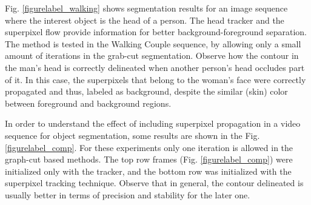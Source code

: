Fig. \ref{figurelabel_walking} shows segmentation results for an image sequence where the interest object is the head of a person.
The head tracker and the superpixel flow provide information for better background-foreground separation. The method is tested in the Walking Couple sequence, by allowing only a small amount of iterations in the
grab-cut segmentation. Observe how the contour in the man's head is correctly delineated when
another person's head occludes part of it. In this case, the superpixels that belong to the woman’s face
were correctly propagated and thus, labeled as background, despite the similar (skin) color between foreground and background regions.

In order to understand the effect of including superpixel propagation in a video sequence for object
segmentation, some results are shown in the Fig. \ref{figurelabel_comp}. For these experiments only one iteration is
allowed in the graph-cut based methods. The top row frames (Fig. \ref{figurelabel_comp}) were initialized only with the tracker, 
and the bottom row was initialized with the superpixel tracking technique. 
Observe that in general, the contour delineated is usually better in terms of precision and
stability for the later one.
\vspace*{-0.5cm}
